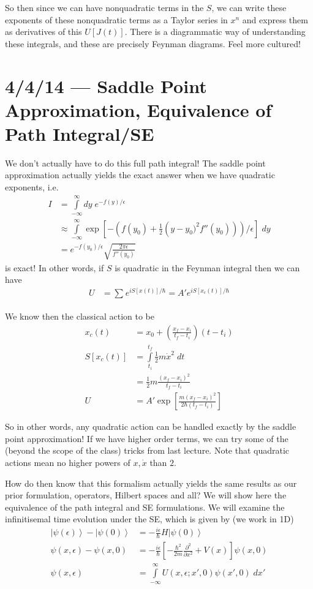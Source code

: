 \documentclass[10pt]{report}
\newcommand{\ket}[1]{\left|#1\right>}
\newcommand{\ptd}[2]{\frac{\partial^2 #1}{\partial#2^2}}
\begin{document}
So then since we can have nonquadratic terms in the $S$, we can write these exponents of these nonquadratic terms as a Taylor series in $x^n$ and express them as derivatives of this $U[J(t)]$. There is a diagrammatic way of understanding these integrals, and these are precisely Feynman diagrams. Feel more cultured!
\chapter{4/4/14 --- Saddle Point Approximation, Equivalence of Path Integral/SE}

We don't actually have to do this full path integral! The saddle point approximation actually yields the exact answer when we have quadratic exponents, i.e.
\begin{align}
    I &= \int\limits_{-\infty}^{\infty}dy\;e^{-f(y)/\epsilon}\\
    &\approx \int\limits_{-\infty}^{\infty}\exp\left[ -\left( f(y_0) + \frac{1}{2}\left( y-y_0)^2f''(y_0) \right) \right)/\epsilon \right]\;dy\\
    &= e^{-f(y_0)/\epsilon}\sqrt{\frac{2\pi\epsilon}{f''(y_0)}}
\end{align}
is exact! In other words, if $S$ is quadratic in the Feynman integral then we can have
\begin{align}
    U &= \sum_{}^{} e^{iS[x(t)]/\hbar} = A'e^{iS[x_c(t)]/\hbar}
\end{align}

We know then the classical action to be
\begin{align}
    x_c(t) &= x_0 + \left( \frac{x_f - x_i}{t_f - t_i} \right)\left( t - t_i \right)\\
    S[x_c(t)] &= \int\limits_{t_i}^{t_f}\frac{1}{2}m\dot{x}^2\;dt\\
    &= \frac{1}{2}m\frac{(x_f - x_i)^2}{t_f - t_i}\\
    U &= A'\exp\left[ \frac{m(x_f - x_i)^2}{2\hbar(t_f - t_i)} \right]
\end{align}

So in other words, any quadratic action can be handled exactly by the saddle point approximation! If we have higher order terms, we can try some of the (beyond the scope of the class) tricks from last lecture. Note that quadratic actions mean no higher powers of $x,\dot{x}$ than $2$. 

How do then know that this formalism actually yields the same results as our prior formulation, operators, Hilbert spaces and all? We will show here the equivalence of the path integral and SE formulations. We will examine the infinitisemal time evolution under the SE, which is given by (we work in 1D)
\begin{align}
    \ket{\psi(\epsilon)} - \ket{\psi(0)} &= -\frac{i\epsilon}{\hbar}H\ket{\psi(0)}\\
    \psi(x,\epsilon) - \psi(x,0) &= -\frac{i\epsilon}{\hbar}\left[ -\frac{\hbar^2}{2m}\ptd{}{x} + V(x) \right]\psi(x,0)\\
    \psi(x,\epsilon) &= \int\limits_{-\infty}^{\infty}U(x,\epsilon; x',0)\psi(x',0)\;dx'
\end{align}
\end{document}
